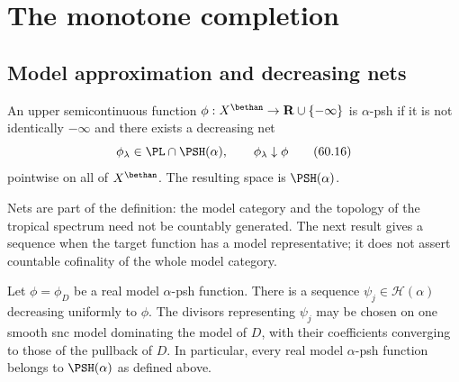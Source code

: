 \section{The monotone completion}
\label{sec:mp-psh-completion}
\subsection{Model approximation and decreasing nets}
\label{subsec:mp-psh-approximation}



\begin{definition}
\label{def:mp-general-psh}
An upper semicontinuous function
$\phi:X^{\bethan}\to\mathbf R\cup\{-\infty\}$ is
$\alpha$-psh if it is not identically $-\infty$ and there exists a
decreasing net
\[
        \phi_\lambda\in\PL\cap\PSH(\alpha),
        \qquad \phi_\lambda\downarrow\phi
\tag{60.16}\label{eq:mp-psh-decreasing-net}
\]
pointwise on all of $X^{\bethan}$.  The resulting space is
$\PSH(\alpha)$.
\end{definition}

Nets are part of the definition: the model category and the topology of the
tropical spectrum need not be countably generated.  The next result gives
a sequence when the target function has a model representative; it does
not assert countable cofinality of the whole model category.

\begin{proposition}
\label{prop:mp-real-model-approximation}
Let $\phi=\phi_D$ be a real model $\alpha$-psh function.
There is a sequence $\psi_j\in\mathcal H(\alpha)$ decreasing uniformly
to $\phi$.  The divisors representing $\psi_j$ may be chosen on one
smooth snc model dominating the model of $D$, with their coefficients
converging to those of the pullback of $D$.  In particular, every real
model $\alpha$-psh function belongs to $\PSH(\alpha)$ as defined above.
\end{proposition}

